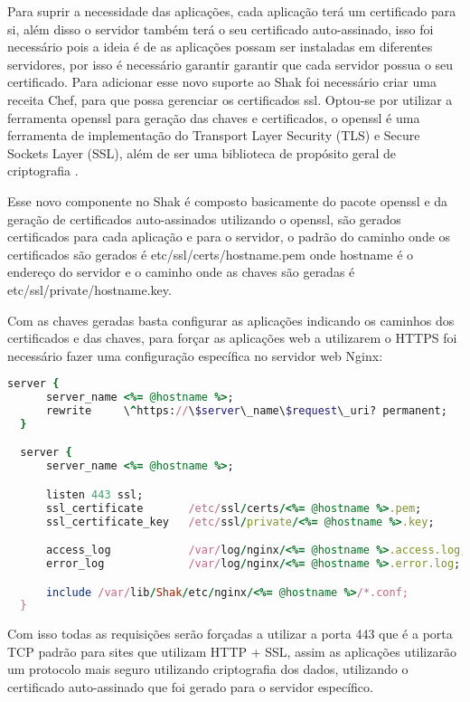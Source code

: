 Para suprir a necessidade das aplicações, cada aplicação terá um certificado para
si, além disso o servidor também terá o seu certificado auto-assinado, isso foi necessário
pois a ideia é de as aplicações possam ser instaladas em diferentes servidores, por
isso é necessário garantir garantir que cada servidor possua o seu certificado. Para adicionar
esse novo suporte ao Shak foi necessário criar uma receita Chef,
para que possa gerenciar os certificados ssl. Optou-se por utilizar a ferramenta
openssl para geração das chaves e certificados, o openssl é uma ferramenta de
implementação do Transport Layer Security (TLS) e Secure Sockets Layer (SSL),
além de ser uma biblioteca de propósito geral de criptografia \cite{openssl}.

Esse novo componente no Shak é composto basicamente do pacote openssl e da geração
de certificados auto-assinados utilizando o openssl, são gerados certificados
para cada aplicação e para o servidor, o padrão do caminho onde os certificados são
gerados é etc/ssl/certs/hostname.pem onde hostname é o endereço do servidor
e o caminho onde as chaves são geradas é etc/ssl/private/hostname.key.

Com as chaves geradas basta configurar as aplicações indicando os caminhos dos certificados
e das chaves, para forçar as aplicações web a utilizarem o HTTPS foi necessário fazer
uma configuração específica no servidor web Nginx:


\begin{lstlisting}[language=Ruby,label=dice_index,caption={Exemplo de arquivo de configuração do Nginx para aplicações web no shak}]
  server {
      server_name <%= @hostname %>;
      rewrite     \^https://\$server\_name\$request\_uri? permanent;
  }

  server {
      server_name <%= @hostname %>;

      listen 443 ssl;
      ssl_certificate       /etc/ssl/certs/<%= @hostname %>.pem;
      ssl_certificate_key   /etc/ssl/private/<%= @hostname %>.key;

      access_log            /var/log/nginx/<%= @hostname %>.access.log;
      error_log             /var/log/nginx/<%= @hostname %>.error.log;

      include /var/lib/Shak/etc/nginx/<%= @hostname %>/*.conf;
  }
\end{lstlisting}

Com isso todas as requisições serão forçadas a utilizar a porta 443 que é a porta
TCP padrão para sites que utilizam HTTP + SSL, assim as aplicações utilizarão
um protocolo mais seguro utilizando criptografia dos dados, utilizando o
certificado auto-assinado que foi gerado para o servidor específico.

